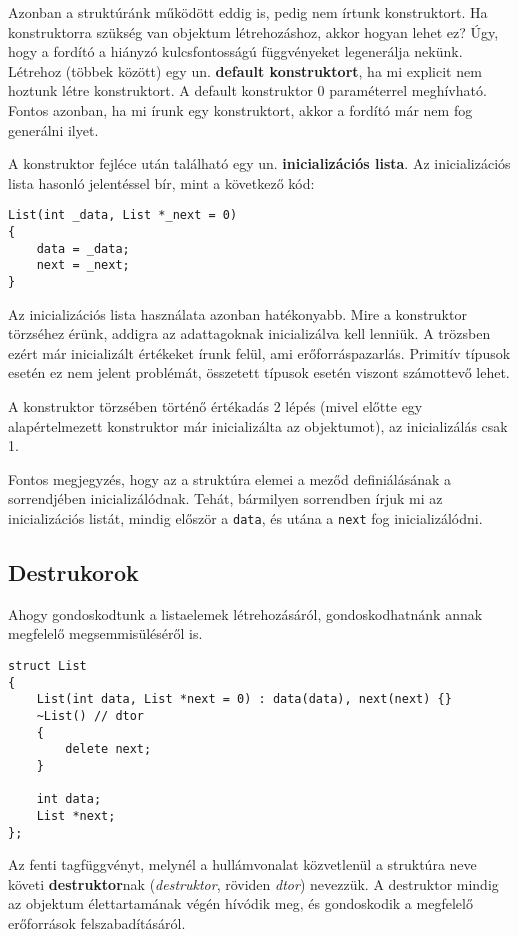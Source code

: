 \documentclass[a4paper,11.5pt,table]{article}
\begin{document}
	\medskip
	Azonban a struktúránk működött eddig is, pedig nem írtunk konstruktort. Ha konstruktorra szükség van objektum létrehozáshoz, akkor hogyan lehet ez? Úgy, hogy a fordító a hiányzó kulcsfontosságú függvényeket legenerálja nekünk. Létrehoz (többek között) egy un. \textbf{default konstruktort}, ha mi explicit nem hoztunk létre konstruktort. A default konstruktor 0 paraméterrel meghívható. Fontos azonban, ha mi írunk egy konstruktort, akkor a fordító már nem fog generálni ilyet.
	
	\medskip
	A konstruktor fejléce után található egy un. \textbf{inicializációs lista}. Az inicializációs lista hasonló jelentéssel bír, mint a következő kód:
	\begin{lstlisting}
List(int _data, List *_next = 0)
{
	data = _data;
	next = _next;
}
	\end{lstlisting}
  Az inicializációs lista használata azonban hatékonyabb.
	Mire a konstruktor törzséhez érünk, addigra az adattagoknak inicializálva kell lenniük. A trözsben ezért már inicializált értékeket írunk felül, ami erőforráspazarlás. Primitív típusok esetén ez nem jelent problémát, összetett típusok esetén viszont számottevő lehet.
	\begin{note}
    A konstruktor törzsében történő értékadás 2 lépés (mivel előtte egy alapértelmezett konstruktor már inicializálta az objektumot), az inicializálás csak 1.
	\end{note}
	Fontos megjegyzés, hogy az a struktúra elemei a meződ definiálásának a sorrendjében inicializálódnak. Tehát, bármilyen sorrendben írjuk mi az inicializációs listát, mindig először a \texttt{data}, és utána a \texttt{next} fog inicializálódni.
	\subsection{Destrukorok}
	Ahogy gondoskodtunk a listaelemek létrehozásáról, gondoskodhatnánk annak megfelelő megsemmisüléséről is.
	\begin{lstlisting}
struct List
{
	List(int data, List *next = 0) : data(data), next(next) {}
	~List() // dtor
	{
		delete next;
	}
	
	int data;
	List *next;
};
	\end{lstlisting}
	Az fenti tagfüggvényt, melynél a hullámvonalat közvetlenül a struktúra neve követi \textbf{destruktor}nak (\textit{destruktor}, röviden \textit{dtor}) nevezzük. A destruktor mindig az objektum élettartamának végén hívódik meg, és gondoskodik a megfelelő erőforrások felszabadításáról. 
	
\end{document}
